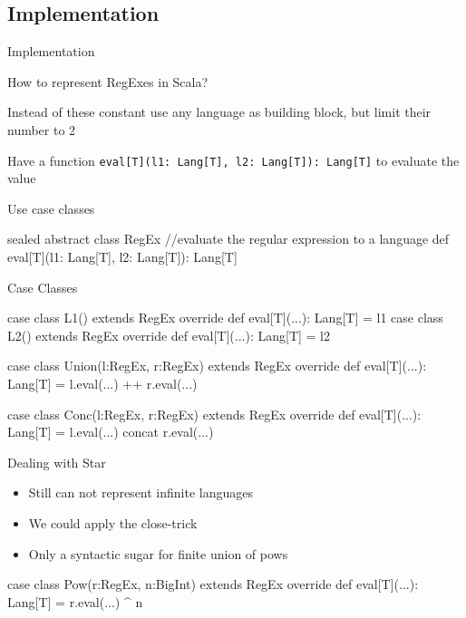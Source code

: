 \documentclass{beamer}
\newcommand{\inline}[1]{\lstinline[language=Stainless,columns=fixed]|#1|}
\begin{document}
\subsection{Implementation}

\begin{frame}[fragile]{Implementation}
	
	How to represent RegExes in Scala?
	
	Instead of these constant use any language as building block, but limit their number to 2
	
	Have a function \inline{eval[T](l1: Lang[T], l2: Lang[T]): Lang[T]} to evaluate the value
	
	
	Use case classes
\begin{Stainless}	
sealed abstract class RegEx {
  //evaluate the regular expression to a language
  def eval[T](l1: Lang[T], l2: Lang[T]): Lang[T]
}
\end{Stainless}	
	
	
\end{frame}

\begin{frame}[fragile]{Case Classes}
\begin{Stainless}
case class L1() extends RegEx {
  override def eval[T](...): Lang[T] = l1
}	
case class L2() extends RegEx {
  override def eval[T](...): Lang[T] = l2
}

case class Union(l:RegEx, r:RegEx) extends RegEx {
  override def eval[T](...): Lang[T] = 
                    l.eval(...) ++ r.eval(...)
}

case class Conc(l:RegEx, r:RegEx) extends RegEx {
  override def eval[T](...): Lang[T] = 
                   l.eval(...) concat r.eval(...)
}

\end{Stainless}
\end{frame}

\begin{frame}[fragile]{Dealing with Star}

\begin{itemize}
	\item Still can not represent infinite languages
	
	\item {We could apply the close-trick	}
	
	\item {Only a syntactic sugar for finite union of pows}
	
\end{itemize}

\begin{Stainless}
case class Pow(r:RegEx, n:BigInt) extends RegEx {
  override def eval[T](...): Lang[T] = 
           r.eval(...) ^ n
}
\end{Stainless}	





\end{frame}
\end{document}

